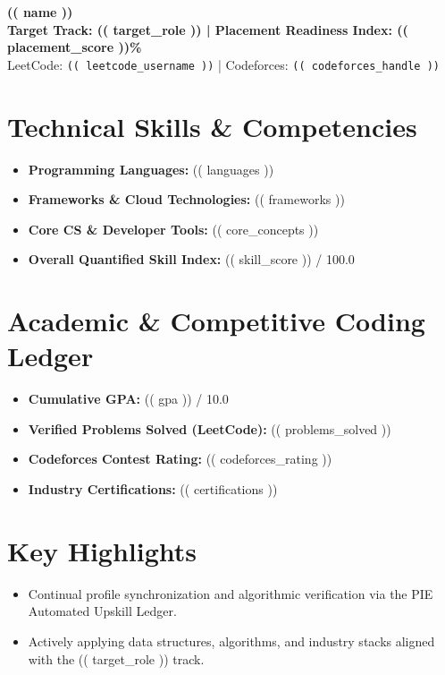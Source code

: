 \documentclass[10pt,a4paper]{article}
\begin{document}
\begin{center}
    {\Huge \textbf{(( name ))}} \\
    \vspace{1.5mm}
    \textbf{Target Track: (( target_role )) \quad | \quad Placement Readiness Index: (( placement_score ))\%} \\
    \vspace{1.5mm}
    \small LeetCode: \texttt{(( leetcode_username ))} \quad | \quad Codeforces: \texttt{(( codeforces_handle ))}
\end{center}

\vspace{-2mm}
\hrulefill
\vspace{2mm}

\section*{Technical Skills \& Competencies}
\begin{itemize}
    \item \textbf{Programming Languages:} (( languages ))
    \item \textbf{Frameworks \& Cloud Technologies:} (( frameworks ))
    \item \textbf{Core CS \& Developer Tools:} (( core_concepts ))
    \item \textbf{Overall Quantified Skill Index:} (( skill_score )) / 100.0
\end{itemize}

\section*{Academic \& Competitive Coding Ledger}
\begin{itemize}
    \item \textbf{Cumulative GPA:} (( gpa )) / 10.0
    \item \textbf{Verified Problems Solved (LeetCode):} (( problems_solved ))
    \item \textbf{Codeforces Contest Rating:} (( codeforces_rating ))
    \item \textbf{Industry Certifications:} (( certifications ))
\end{itemize}

\section*{Key Highlights}
\begin{itemize}
    \item Continual profile synchronization and algorithmic verification via the PIE Automated Upskill Ledger.
    \item Actively applying data structures, algorithms, and industry stacks aligned with the (( target_role )) track.
\end{itemize}
\end{document}
